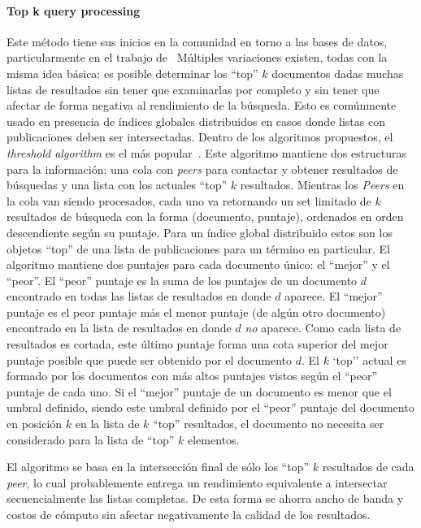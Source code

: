 \paragraph{Top k query processing~\cite{suel2003odissea, balke2005progressive, michel2005klee, zhang2005efficient}} %
Este método tiene sus inicios en la comunidad en torno a las bases de datos,
particularmente en el trabajo de~\citealt{fagin2001optimal} %
Múltiples variaciones existen, todas con la misma idea básica: es posible
determinar los ``top'' $k$ documentos dadas muchas listas de resultados sin tener
que examinarlas por completo y sin tener que afectar de forma negativa al
rendimiento de la búsqueda. Esto es comúnmente usado en presencia de índices
globales distribuidos en casos donde listas con publicaciones deben ser intersectadas.
Dentro de los algoritmos propuestos, el \textit{threshold algorithm} es el más
popular~\citealt{michel2005klee, suel2003odissea}. %
Este algoritmo mantiene dos estructuras para la información: una cola con
\textit{peers} para contactar y obtener resultados de búsquedas y una lista con
los actuales ``top'' $k$ resultados. Mientras los \textit{Peers} en la cola van
siendo procesados, cada uno va retornando un set limitado de $k$ resultados de búsqueda con
la forma (documento, puntaje), ordenados en orden descendiente según su puntaje.
Para un índice global distribuido estos son los objetos ``top'' de una lista de
publicaciones para un término en particular. El algoritmo mantiene dos puntajes
para cada documento único: el ``mejor'' y el ``peor''. El ``peor'' puntaje es la suma de
los puntajes de un documento $d$ encontrado en todas las listas de resultados en
donde $d$ aparece. El ``mejor'' puntaje es el peor puntaje más el menor puntaje
(de algún otro documento) encontrado en la lista de resultados en donde $d$
\textit{no} aparece. Como cada lista de resultados es cortada, este último
puntaje forma una cota superior del mejor puntaje posible que puede ser obtenido
por el documento $d$. El $k$ `top'' actual  es formado por los documentos con más altos
puntajes vistos según el ``peor'' puntaje de cada uno. Si el ``mejor'' puntaje
de un documento es menor que el umbral definido, siendo este umbral definido por el ``peor'' puntaje del
documento en posición $k$ en la lista de $k$ ``top'' resultados, el documento no
necesita ser considerado para la lista de ``top'' $k$ elementos.

El algoritmo se basa en la intersección final de sólo los ``top'' $k$ resultados
de cada \textit{peer}, lo cual probablemente entrega un rendimiento equivalente
a intersectar secuencialmente las listas completas. De esta forma se ahorra
ancho de banda y costos de cómputo sin afectar negativamente la calidad de los
resultados.

